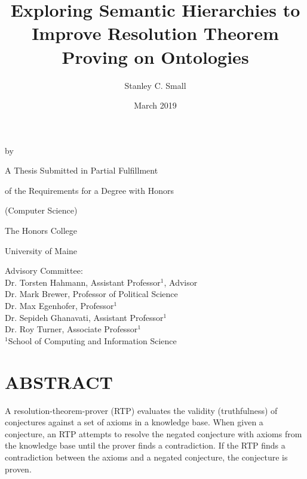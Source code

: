\documentclass{article}
\title{Exploring Semantic Hierarchies to Improve Resolution Theorem Proving on Ontologies}
\author{Stanley C. Small}
\date{March 2019}
\begin{document}
\begin{titlepage}
	\makeatletter
		\begin{center}
   				\MakeUppercase{\@title} \par
  				\smallskip 
 				\vspace{.15in} by \par
 				\smallskip
  				\vspace{.15in} \@author \par
  				\vspace{1in}
 				A Thesis Submitted in Partial Fulfillment  \par
  				of the Requirements for a Degree with Honors \par
  				(Computer Science) \par
  				\vspace{.75in}
  				The Honors College \par
  				University of Maine \par
  				\@date \par
 				\vfill
   		\end{center}
	\makeatother
	\begin{flushleft}
		Advisory Committee: \\
		\hspace{.3in} Dr. Torsten Hahmann, Assistant Professor$^{1}$, Advisor \\
		\hspace{.3in} Dr. Mark Brewer, Professor of Political Science \\
		\hspace{.3in} Dr. Max Egenhofer, Professor$^{1}$ \\
		\hspace{.3in} Dr. Sepideh Ghanavati, Assistant Professor$^{1}$ \\
		\hspace{.3in} Dr. Roy Turner, Associate Professor$^{1}$ \\
		\hfill \break
		\hspace{.3in} $^{1}$School of Computing and Information Science
	\end{flushleft}
\end{titlepage}

\newpage
{}
\vspace*{.05in}
\section*{\MakeUppercase{Abstract}}
A resolution-theorem-prover (RTP) evaluates the validity (truthfulness) of conjectures against a set of axioms in a knowledge base. When given a conjecture, an RTP attempts to resolve the negated conjecture with axioms from the knowledge base until the prover finds a contradiction. If the RTP finds a contradiction between the axioms and a negated conjecture, the conjecture is proven. 
\end{document}

